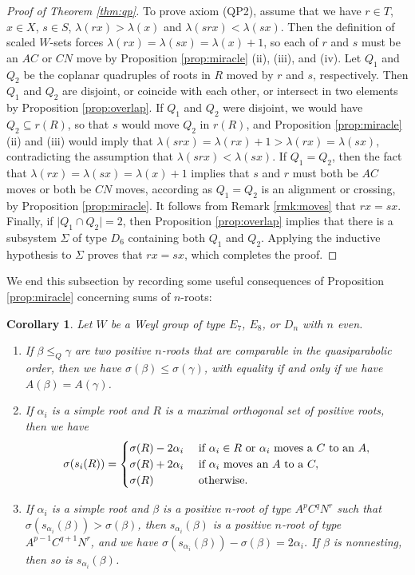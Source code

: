 \documentclass[11pt]{amsart}
\theoremstyle{plain}
\newtheorem{cor}[theorem]{Corollary}
\theoremstyle{definition}
\theoremstyle{remark}
\numberwithin{equation}{subsection}
\newcommand{\al}{\alpha}
\newcommand{\be}{\beta}
\newcommand{\se}{\subseteq}
\newcommand{\abs}[1]{\lvert #1 \rvert}
\begin{document}
\begin{proof}[Proof of Theorem \ref{thm:qp}]
To prove axiom (QP2), assume that we have $r \in T$, $x \in X$, $s \in S$,
$\lambda(rx) > \lambda(x)$ and $\lambda(srx) < \lambda(sx)$.  Then the
definition of scaled $W$-sets forces $\lambda(rx) =\lambda(sx)= \lambda(x)+1$,
so each of $r$ and $s$ must be an $AC$ or $CN$ move by Proposition
\ref{prop:miracle} (ii), (iii), and (iv). Let $Q_1$ and $Q_2$ be the coplanar
quadruples of roots in $R$ moved by $r$ and $s$, respectively. Then $Q_1$ and
$Q_2$ are disjoint, or coincide with each other, or intersect in two elements by
Proposition \ref{prop:overlap}. If $Q_1$ and $Q_2$ were disjoint, we would have
$Q_2\se r(R)$, so that $s$ would move $Q_2$ in $r(R)$, and Proposition
\ref{prop:miracle} (ii) and (iii) would imply that $
\lambda(srx)=\lambda(rx)+1>\lambda(rx)=\lambda(sx), $ contradicting the
assumption that $\lambda(srx)<\lambda(sx)$.  If $Q_1=Q_2$, then the fact that
$\lambda(rx)=\lambda(sx)=\lambda(x)+1$ implies that $s$ and $r$ must both be
$AC$ moves or both be $CN$ moves, according as $Q_1=Q_2$ is an alignment or
crossing, by Proposition \ref{prop:miracle}. It follows from Remark
\ref{rmk:moves} that $rx=sx$. Finally, if $\abs{Q_1\cap Q_2}=2$, then
Proposition \ref{prop:overlap} implies that there is a subsystem $\Sigma$ of
type $D_6$ containing both $Q_1$ and $Q_2$.  Applying the inductive hypothesis
to $\Sigma$ proves that $rx = sx$, which completes the proof.
\end{proof}

We end this subsection by recording some useful consequences of Proposition
\ref{prop:miracle} concerning sums of $n$-roots:


\begin{cor}\label{cor:moveup}
Let $W$ be a Weyl group of type $E_7$, $E_8$, or $D_{n}$ with $n$ even.
\begin{enumerate}
\item[{\rm (i)}]{If $\be \leq_Q \gamma$ are two positive $n$-roots that are
     comparable in the quasiparabolic order, then we have $\sigma(\be) \leq
 \sigma(\gamma)$, with equality if and only if we have $A(\be) = A(\gamma)$.}
\item[{\rm (ii)}] {If $\al_i$ is a simple root and $R$ is a maximal orthogonal
     set of positive roots, then we have $$ \sigma(s_{i}(R)) =
     \begin{cases} \sigma(R) - 2\al_i & \text{\ if\ } \al_i \in R \text{\ or\ }
              \al_i \text{\ moves\ a\ } C \text{\ to\ an\ } A,\\ \sigma(R) +
              2\al_i & \text{\ if\ } \al_i \text{\ moves\ an\ } A \text{\ to\ a\
              } C,\\ \sigma(R) & \text{\ otherwise}.
      \end{cases}$$}
  \item[{\rm (iii)}]{If $\al_i$ is a simple root and $\beta$ is a positive
         $n$-root of type $A^pC^qN^r$ such that $\sigma(s_{\al_i}(\be)) >
         \sigma(\be)$, then $s_{\al_i}(\be)$ is a positive $n$-root of type
         $A^{p-1}C^{q+1}N^r$, and we have $\sigma(s_{\al_i}(\be)) - \sigma(\be)
     = 2\al_i$. If $\be$ is nonnesting, then so is $s_{\al_i}(\be)$.}
\end{enumerate}
\end{cor}
\end{document}
